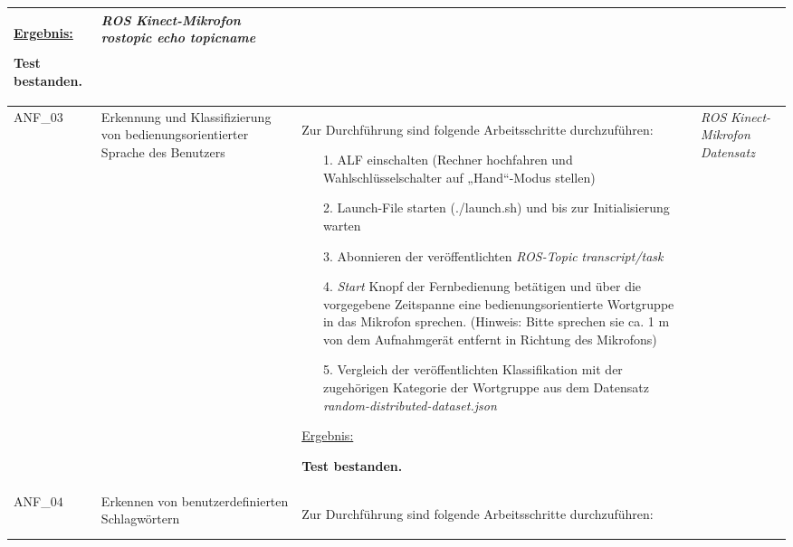 \documentclass[12pt,a4paper,oneside,numbers=noenddot,captions=tableheading,toc=bibliography,openany,tikz,margin=5mm]{scrbook}
\begin{document}
\begin{longtable}{|p{}|p{}|p{7cm}|p{}|}
\underline{Ergebnis:}\newline
\newline

\textbf{Test bestanden.}	%
& \textit{ROS}\newline
\textit{Kinect-Mikrofon}\newline
\textit{rostopic echo topicname}\newline

\\
\hline

ANF\_$03$ & Erkennung und Klassifizierung von bedienungsorientierter Sprache des Benutzers & Zur Durchführung sind folgende Arbeitsschritte durchzuführen:
\begin{itemize}
	
	\item[1.]	ALF einschalten (Rechner hochfahren und Wahlschlüsselschalter auf „Hand“-Modus stellen)
	\item[2.]	Launch-File starten (./launch.sh) und bis zur Initialisierung warten
	\item[3.]	Abonnieren der veröffentlichten \textit{ROS-Topic} \textit{transcript/task}
	\item[4.]	\textit{Start} Knopf der Fernbedienung betätigen und über die vorgegebene Zeitspanne eine bedienungsorientierte Wortgruppe in das Mikrofon sprechen. (Hinweis: Bitte sprechen sie ca. 1 m von dem Aufnahmgerät entfernt in Richtung des Mikrofons)
	\item[5.]	Vergleich der veröffentlichten Klassifikation mit der zugehörigen Kategorie der Wortgruppe aus dem Datensatz \textit{random-distributed-dataset.json}
	
\end{itemize}

\underline{Ergebnis:}\newline
\newline

\textbf{Test bestanden.}	%
& \textit{ROS}\newline
\textit{Kinect-Mikrofon}\newline
\textit{Datensatz}\newline
\\
\hline

ANF\_$04$ & 	Erkennen von benutzerdefinierten Schlagwörtern & Zur Durchführung sind folgende Arbeitsschritte durchzuführen:
\begin{itemize}
	

\end{itemize}
\end{longtable}
\end{document}
